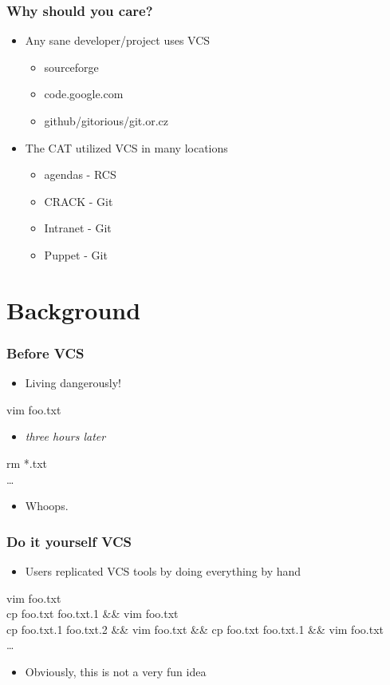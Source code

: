 \documentclass{beamer}
\begin{document}
\begin{frame}
  \frametitle{Why should you care?}
  \begin{itemize}
    \item Any sane developer/project uses VCS
      \begin{itemize}
	\item sourceforge
	\item code.google.com
	\item github/gitorious/git.or.cz
      \end{itemize}
    \item The CAT utilized VCS in many locations
      \begin{itemize}
	\item agendas - RCS
	\item CRACK - Git
	\item Intranet - Git
	\item Puppet - Git
      \end{itemize}
  \end{itemize}
\end{frame}

\section{Background}

\begin{frame}
  \frametitle{Before VCS}
  \begin{itemize}
    \item Living dangerously!
  \end{itemize}
  vim foo.txt \\
  \begin{itemize}
    \item {\em three hours later} \\
  \end{itemize}
  rm *.txt \\
  \ldots \\
  \begin{itemize}
    \item Whoops. \\
  \end{itemize}
\end{frame}

\begin{frame}
  \frametitle{Do it yourself VCS}
  \begin{itemize}
    \item Users replicated VCS tools by doing everything by hand
  \end{itemize}
  vim foo.txt \\
  cp foo.txt foo.txt.1 \&\& vim foo.txt \\
  cp foo.txt.1 foo.txt.2 \&\& vim foo.txt \&\& cp foo.txt foo.txt.1 \&\& vim foo.txt \\
  \ldots
  \begin{itemize}
    \item Obviously, this is not a very fun idea
  \end{itemize}
\end{frame}
\end{document}
